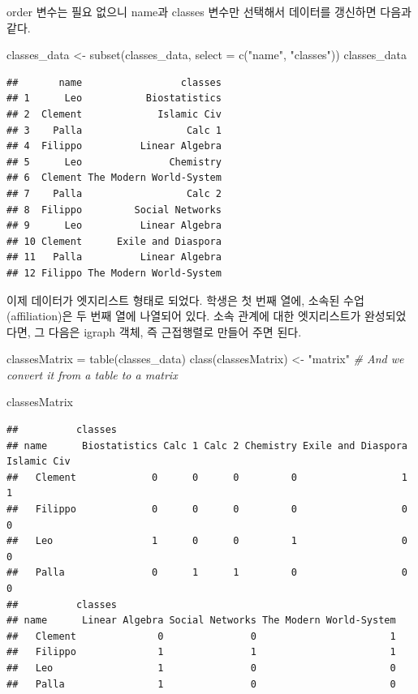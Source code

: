 \documentclass[
]{book}
\newenvironment{Shaded}{\begin{snugshade}}{\end{snugshade}}
\newcommand{\AttributeTok}[1]{\textcolor[rgb]{0.77,0.63,0.00}{#1}}
\newcommand{\CommentTok}[1]{\textcolor[rgb]{0.56,0.35,0.01}{\textit{#1}}}
\newcommand{\FunctionTok}[1]{\textcolor[rgb]{0.00,0.00,0.00}{#1}}
\newcommand{\NormalTok}[1]{#1}
\newcommand{\OtherTok}[1]{\textcolor[rgb]{0.56,0.35,0.01}{#1}}
\newcommand{\StringTok}[1]{\textcolor[rgb]{0.31,0.60,0.02}{#1}}
\begin{document}
order 변수는 필요 없으니 name과 classes 변수만 선택해서 데이터를 갱신하면 다음과 같다.

\begin{Shaded}
\begin{Highlighting}[]
\NormalTok{classes\_data }\OtherTok{\textless{}{-}} \FunctionTok{subset}\NormalTok{(classes\_data, }\AttributeTok{select =} \FunctionTok{c}\NormalTok{(}\StringTok{"name"}\NormalTok{, }\StringTok{"classes"}\NormalTok{))}
\NormalTok{classes\_data}
\end{Highlighting}
\end{Shaded}

\begin{verbatim}
##       name                 classes
## 1      Leo           Biostatistics
## 2  Clement             Islamic Civ
## 3    Palla                  Calc 1
## 4  Filippo          Linear Algebra
## 5      Leo               Chemistry
## 6  Clement The Modern World-System
## 7    Palla                  Calc 2
## 8  Filippo         Social Networks
## 9      Leo          Linear Algebra
## 10 Clement      Exile and Diaspora
## 11   Palla          Linear Algebra
## 12 Filippo The Modern World-System
\end{verbatim}

이제 데이터가 엣지리스트 형태로 되었다. 학생은 첫 번째 열에, 소속된 수업(affiliation)은 두 번째 열에 나열되어 있다. 소속 관계에 대한 엣지리스트가 완성되었다면, 그 다음은 igraph 객체, 즉 근접행렬로 만들어 주면 된다.

\begin{Shaded}
\begin{Highlighting}[]
\NormalTok{classesMatrix }\OtherTok{=} \FunctionTok{table}\NormalTok{(classes\_data)}
\FunctionTok{class}\NormalTok{(classesMatrix) }\OtherTok{\textless{}{-}} \StringTok{"matrix"} \CommentTok{\# And we convert it from a table to a matrix}

\NormalTok{classesMatrix}
\end{Highlighting}
\end{Shaded}

\begin{verbatim}
##          classes
## name      Biostatistics Calc 1 Calc 2 Chemistry Exile and Diaspora Islamic Civ
##   Clement             0      0      0         0                  1           1
##   Filippo             0      0      0         0                  0           0
##   Leo                 1      0      0         1                  0           0
##   Palla               0      1      1         0                  0           0
##          classes
## name      Linear Algebra Social Networks The Modern World-System
##   Clement              0               0                       1
##   Filippo              1               1                       1
##   Leo                  1               0                       0
##   Palla                1               0                       0
\end{verbatim}
\end{document}
